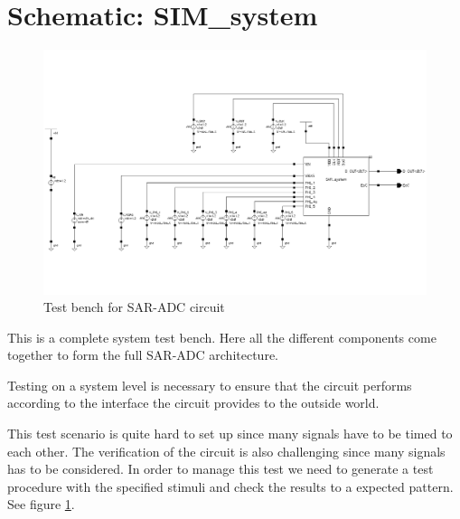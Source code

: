 \documentclass[english, a4paper,11pt]{article}
\begin{document}
\section*{Schematic: SIM\_system}
\begin{figure}[!ht]
 \centering
   \includegraphics[width=\textwidth]{img/SIM_system.png}
   \caption{Test bench for SAR-ADC circuit}
   \label{sim:system}
\end{figure}
This is a complete system test bench. Here all the different components come together to form the full SAR-ADC architecture. 

Testing on a system level is necessary to ensure that the circuit performs according to the interface the circuit provides to the outside world.

This test scenario is quite hard to set up since many signals have to be timed to each other. The verification of the circuit is also challenging since many signals has to be considered.
In order to manage this test we need to generate a test procedure with the specified stimuli and check the results to a expected pattern.
See figure \ref{sim:system}.
\end{document}

